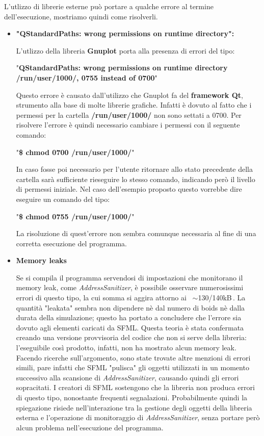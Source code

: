 \documentclass{article}
\begin{document}
L'utlizzo di librerie esterne può portare a qualche errore al termine dell'esecuzione, mostriamo quindi come risolverli. 
\begin{itemize}
    
    \bigskip
    \item \large\textbf{"QStandardPaths: wrong permissions on runtime directory":} 

\smallskip
    \normalsize
    L'utlizzo della libreria \textbf{Gnuplot} porta alla presenza di errori del tipo: 
    
    \medskip
    "\textbf{QStandardPaths: wrong permissions on runtime directory /run/user/1000/, 0755 instead of 0700}"

    Questo errore è causato dall'utilizzo che Gnuplot fa del \textbf{framework Qt}, strumento alla base di molte librerie grafiche. 
    Infatti è dovuto al fatto che i permessi per la cartella \textbf{/run/user/1000/} non sono settati a 0700.
    Per risolvere l'errore è quindi necessario cambiare i permessi con il seguente comando:

     \medskip
     "\textbf{\$ chmod 0700 /run/user/1000/}"

    \smallskip
     In caso fosse poi necessario per l'utente ritornare allo stato precedente della cartella sarà sufficiente rieseguire lo stesso comando, indicando però il livello di permessi iniziale. Nel caso dell'esempio proposto questo vorrebbe dire eseguire un comando del tipo:

     \medskip
     "\textbf{\$ chmod 0755 /run/user/1000/}"

     \smallskip

     La risoluzione di quest'errore non sembra comunque necessaria al fine di una corretta esecuzione del programma.

    \bigskip\smallskip
    \item \large\:\textbf{Memory leaks} \normalsize


    \smallskip
    Se si compila il programma servendosi di impostazioni che monitorano il memory leak, come \textit{AddressSanitizer}, è possibile osservare numerosissimi errori di questo tipo, la cui somma si aggira attorno ai \,
     $\sim$130/140kB\,. La quantità "leakata" sembra non dipendere nè dal numero di boids nè dalla durata della simulazione; questo ha portato a concludere che l'errore sia dovuto agli elementi caricati da SFML. Questa teoria è stata confermata creando una versione provvisoria del codice che non si serve della libreria: l'eseguibile così prodotto, infatti, non ha mostrato alcun memory leak.
     Facendo ricerche sull'argomento, sono state trovate altre menzioni di errori simili, pare infatti che SFML "pulisca" gli oggetti utilizzati in un momento successivo alla scansione di \textit{AddressSanitizer}, causando quindi gli errori sopracitati. I creatori di SFML sostengono che la libreria non produca errori di questo tipo, nonostante frequenti segnalazioni. Probabilmente quindi la spiegazione risiede nell'interazione tra la gestione degli oggetti della libreria esterna e l'operazione di monitoraggio di \textit{AddressSanitizer}, senza portare però alcun problema nell'esecuzione del programma.
    

\end{itemize}
         
\end{document}
